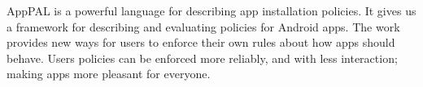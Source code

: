 \documentclass[]{llncs}
\begin{document}
AppPAL is a powerful language for describing app installation policies.
It gives us a framework for describing and evaluating policies for Android apps.
The work provides new ways for users to enforce their own rules about how apps should behave.
Users policies can be enforced more reliably, and with less interaction;
  making apps more pleasant for everyone.



\end{document}
